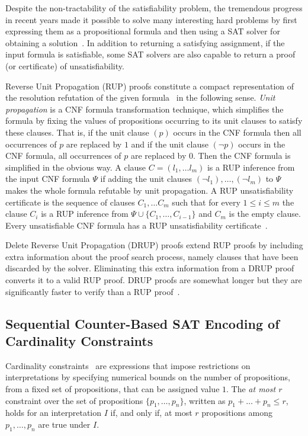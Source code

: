 \documentclass{article} \usepackage[utf8]{inputenc}
\begin{document}
Despite the non-tractability of the satisfiability problem, the tremendous
progress in recent years made it possible to solve many interesting hard
problems by first expressing them as a propositional formula and then
using a {SAT solver} for obtaining a solution~\cite{satHB}. In addition to
returning a satisfying assignment, if the input formula is satisfiable, some
SAT solvers are also capable to return a proof (or certificate) of
unsatisfiability. 

Reverse Unit Propagation (RUP) proofs constitute a compact representation of 
the resolution refutation of the given formula~\cite{GoldbergN03} in the following sense.
\emph{Unit propagation} is a CNF formula transformation
technique, which simplifies the formula by fixing the values of 
propositions occurring to its unit clauses to satisfy these clauses. 
That is, if the unit clause $(p)$ occurs in the CNF formula then 
all occurrences of $p$ are replaced by $1$ and if the unit clause
$(\lnot p)$  occurs in the CNF formula, all occurrences of 
$p$ are replaced by $0$. Then the CNF formula is simplified in the obvious way.
A clause $C = (l_1,\dots l_m)$ is a RUP inference from the input CNF formula
$\Psi$ if adding the unit clauses $(\lnot l_1),\dots,(\lnot l_m)$ to $\Psi$ makes the whole
formula refutable by unit propagation.  A RUP unsatisfiability certificate is
the sequence of clauses $C_1,\dots C_m$ such that for every $1\leq i \leq m$ 
the clause $C_i$ is a RUP inference from $\Psi\cup\{C_1,\dots,C_{i-1}\}$ and
$C_m$ is the empty clause.  Every unsatisfiable CNF formula has a RUP
unsatisfiability certificate~\cite{GoldbergN03}.

Delete Reverse Unit Propagation (DRUP) proofs extend  RUP proofs by including
extra information about the proof search process, namely clauses that have been
discarded by the solver.  Eliminating this extra information from a DRUP proof
converts it to a valid RUP proof.  DRUP proofs are somewhat longer but they are
significantly faster to verify than a RUP proof~\cite{druptrim}. 


\subsection{Sequential Counter-Based SAT Encoding of Cardinality Constraints}\label{sec:sinz_card}
Cardinality constraints~\cite{cardconstrHB} are expressions that impose restrictions on
interpretations by specifying numerical bounds on the number of propositions,
from a fixed set of propositions, that can be assigned value $1$. The \emph{at
most $r$} constraint over the set of propositions $\{p_1,\dots, p_n\}$, written
as $p_1+\dots+p_n\leq r$, holds for an interpretation $I$ if, and only if,
at most $r$ propositions among $p_1,\dots, p_n$ are true under $I$.
\end{document}
